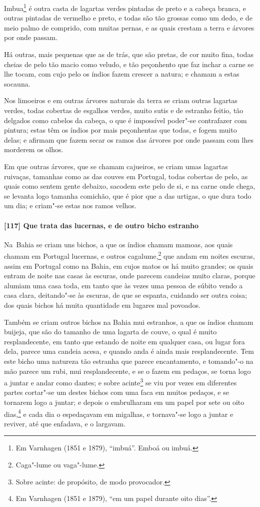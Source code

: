 Imbua\footnote{ Em Varnhagen (1851 e 1879), ``imbuá''. Emboá ou imbuá.} é outra casta de
lagartas verdes pintadas de preto e a cabeça branca, e outras pintadas de vermelho e
preto, e todas são tão grossas como um dedo, e de meio palmo de comprido, com muitas
pernas, e as quais crestam a terra e árvores por onde passam.

Há outras, mais pequenas que as de trás, que são pretas, de cor muito fina, todas cheias
de pelo tão macio como veludo, e tão peçonhento que faz inchar a carne se lhe tocam, com
cujo pelo os índios fazem crescer a natura; e chamam a estas socauna.

Nos limoeiros e em outras árvores naturais da terra se criam outras lagartas verdes, todas
cobertas de esgalhos verdes, muito sutis e de estranho feitio, tão delgados como cabelos
da cabeça, o que é impossível poder"-se contrafazer com pintura; estas têm os índios por
mais peçonhentas que todas, e fogem muito delas; e afirmam que fazem secar os ramos das
árvores por onde passam com lhes morderem os olhos.

Em que outras árvores, que se chamam cajueiros, se criam umas lagartas ruivaças, tamanhas
como as das couves em Portugal, todas cobertas de pelo, as quais como sentem gente
debaixo, sacodem este pelo de si, e na carne onde chega, se levanta logo tamanha comichão,
que é pior que a das urtigas, o que dura todo um dia; e criam"-se estas nos ramos velhos.

\paragraph{[117] Que trata das lucernas, e de outro bicho estranho}\quad
\mbox{Na Bahia} se criam uns bichos, a que os índios chamam mamoas, aos quais chamam em Portugal
lucernas, e outros cagalume,\footnote{ Caga"-lume ou vaga"-lume.} que andam em noites
escuras, assim em Portugal como na Bahia, em cujos matos os há muito grandes; os quais
entram de noite nas casas às escuras, onde parecem candeias muito claras, porque alumiam
uma casa toda, em tanto que às vezes uma pessoa de súbito vendo a casa clara, deitando"-se
às escuras, de que se espanta, cuidando ser outra coisa; dos quais bichos há muita
quantidade em lugares mal povoados.

Também se criam outros bichos na Bahia mui estranhos, a que os índios chamam buijeja, que
são do tamanho de uma lagarta de couve, o qual é muito resplandecente, em tanto que
estando de noite em qualquer casa, ou lugar fora dela, parece uma candeia acesa, e quando
anda é ainda mais resplandecente. Tem este bicho uma natureza tão estranha que parece
encantamento, e tomando"-o na mão parece um rubi, mui resplandecente, e se o fazem em
pedaços, se torna logo a juntar e andar como dantes; e sobre acinte\footnote{ Sobre
acinte: de propósito, de modo provocador.} se viu por vezes em diferentes partes 
cortar"-se um destes bichos com uma faca em muitos pedaços, e se tornarem logo a
juntar; e depois o embrulharam em um papel por sete ou oito dias,\footnote{ Em Varnhagen
(1851 e 1879), ``em um papel durante oito dias''.} e cada dia o espedaçavam em migalhas, e
tornava"-se logo a juntar e reviver, até que enfadava, e o largavam.

